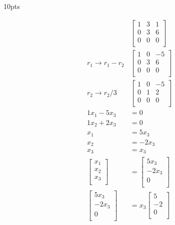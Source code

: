 \begin{prob} 10pts
\begin{subprob}
\begin{align*}
&\begin{bmatrix}
   1 & 3 & 1\\
   0 & 3 & 6\\
   0 & 0 & 0\\
\end{bmatrix}\\
r_1\rightarrow r_1-r_2&\begin{bmatrix}
   1 & 0 & -5\\
   0 & 3 & 6\\
   0 & 0 & 0\\
\end{bmatrix}\\
r_2\rightarrow r_2/3&\begin{bmatrix}
   1 & 0 & -5\\
   0 & 1 & 2\\
   0 & 0 & 0\\
\end{bmatrix}\\
1x_1-5x_3&=0\\
1x_2+2x_3&=0\\
x_1&=5x_3\\
x_2&=-2x_3\\
x_3&=x_3\\
\begin{bmatrix}
   x_1\\
   x_2\\
   x_3\\
\end{bmatrix}&=\begin{bmatrix}
   5x_3\\
   -2x_3\\
   0\\
\end{bmatrix}\\
\begin{bmatrix}
   5x_3\\
   -2x_3\\
   0\\
\end{bmatrix}&=x_3\begin{bmatrix}
   5\\
   -2\\
   0\\
\end{bmatrix}
\end{align*}
\end{subprob}

\end{prob}
